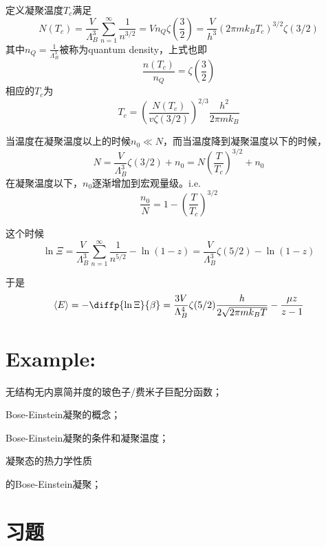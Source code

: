 \begin{definition}
    定义凝聚温度$T_c$满足\begin{equation}
        N(T_c) =\frac{V}{\Lambda_B^3} \sum_{n=1}^{\infty} \frac{1}{n^{3/2}} = V n_Q \zeta(\frac{3}{2}) = \frac{V}{h^3} (2\pi m k_B T_c)^{3/2} \zeta(3/2)
    \end{equation}
    其中$n_Q=\frac{1}{\Lambda_B^3}$被称为quantum density，上式也即\begin{equation}
        \frac{n(T_c)}{n_Q} =\zeta(\frac{3}{2})
    \end{equation}
    相应的$T_c$为\begin{equation}
        T_c = \left(\frac{N(T_c)}{v\zeta(3/2)}\right)^{2/3} \frac{h^2}{2\pi m k_B}
    \end{equation}
\end{definition}

当温度在凝聚温度以上的时候$n_0\ll N$，而当温度降到凝聚温度以下的时候，\begin{equation}
    N=\frac{V}{\Lambda_B^3} \zeta(3/2) +n_0=N \left(\frac{T}{T_c}\right)^{3/2} +n_0
\end{equation}
在凝聚温度以下，$n_0$逐渐增加到宏观量级。i.e.\begin{equation}
    \frac{n_0}{N} =1- \left(\frac{T}{T_c}\right)^{3/2}
\end{equation}

这个时候\begin{equation}
    \ln \Xi = \frac{V}{\Lambda_B^3}  \sum_{n=1}^{\infty} \frac{1}{n^{5/2}} -\ln(1-z) = \frac{V}{\Lambda_B^3}\zeta(5/2) -\ln(1-z)
\end{equation}

于是\begin{equation}
    \braket{E} =-\diffp{\ln \Xi}{\beta} = \frac{3V}{\Lambda_B^4}\zeta(5/2) \frac{h}{2\sqrt{2\pi mk_B T}} -\frac{\mu z}{z-1}
\end{equation}

\section{Example:} %
\label{sec:Example:He 3}

\begin{review}
    \item 无结构无内禀简并度的玻色子/费米子巨配分函数；
    \item Bose-Einstein凝聚的概念；
    \item Bose-Einstein凝聚的条件和凝聚温度；
    \item 凝聚态的热力学性质
    \item {}的Bose-Einstein凝聚；
\end{review}

\section{习题} %
\label{sec:习题9}


